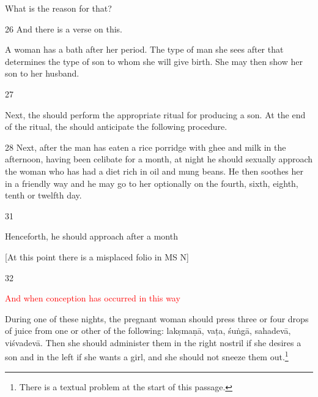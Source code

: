 \begin{translation}
    What is the reason for that?
     
     
     \item[26]
     And there is a verse on this.
     
     \begin{sloka}
         
         A woman has a bath after her period.  The type of man she sees after 
         that determines the type of son to whom she will give birth. She may then 
         show her son to her husband.     
           
     \end{sloka}
        
        \item[27]
        
\begin{sloka}
            Next, the  should perform the appropriate 
            ritual 
        for producing a son.  At the end of the ritual, the  
        should anticipate the following procedure. 
 
\end{sloka}       

\item [28]
        Next, after the man has eaten a rice porridge with ghee and milk in the
afternoon, having been celibate for a month, at night he should sexually
approach the woman who has had a diet rich in oil and mung beans.  He then
soothes her in a friendly way and he may go to her optionally on the fourth, 
sixth, eighth, tenth or twelfth day. 
        
        
 \item [31]

Henceforth, he should approach after a month

[At this point there is a misplaced folio in MS N]
  
\item[32] 

\textcolor{red}{And when conception has occurred in this 
way}\q{\textcolor{red}{Problematic 
passage in the edition.}}

During one of these nights, the pregnant woman should press three or
four drops of juice from one or other of the following:
\gls{lakṣmaṇā}, \gls{vaṭa}, \gls{śuṅgā}, \gls{sahadevā},
\gls{viśvadevā}. Then she should administer them in the right nostril if she
desires a son and in the left if she wants a girl, and she should not
sneeze them out.\footnote{There is a textual problem at the start of this 
passage.}



\end{translation}
